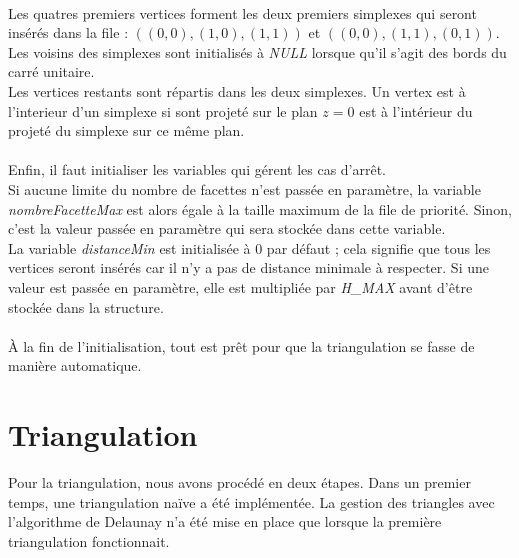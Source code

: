 \documentclass{article}
\begin{document}
    \paragraph{}
    Les quatres premiers vertices forment les deux premiers simplexes qui seront insérés dans la file : $((0,0), (1,0), (1,1))$ et $((0,0), (1,1), (0,1))$. Les voisins des simplexes sont initialisés à \textit{NULL} lorsque qu'il s'agit des bords du carré unitaire.
    \\Les vertices restants sont répartis dans les deux simplexes. Un vertex est à l'interieur d'un simplexe si sont projeté sur le plan $z=0$ est à l'intérieur du projeté du simplexe sur ce même plan.
    
    \paragraph{}
    Enfin, il faut initialiser les variables qui gérent les cas d'arrêt.
    \\Si aucune limite du nombre de facettes n'est passée en paramètre, la variable \textit{nombreFacetteMax} est alors égale à la taille maximum de la file de priorité. Sinon, c'est la valeur passée en paramètre qui sera stockée dans cette variable.
    \\La variable \textit{distanceMin} est initialisée à $0$ par défaut ; cela signifie que tous les vertices seront insérés car il n'y a pas de distance minimale à respecter. Si une valeur est passée en paramètre, elle est multipliée par \textit{H\_MAX} avant d'être stockée dans la structure.

    \paragraph{}
    \`{A} la fin de l'initialisation, tout est prêt pour que la triangulation se fasse de manière automatique.
    
\section{Triangulation}
    Pour la triangulation, nous avons procédé en deux étapes. Dans un premier temps, une triangulation naïve a été implémentée. La gestion des triangles avec l'algorithme de Delaunay n'a été mise en place que lorsque la première triangulation fonctionnait.
    
\end{document}
